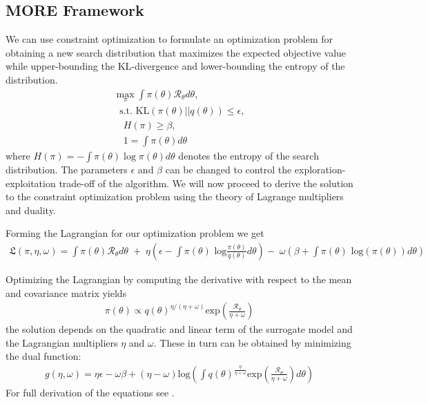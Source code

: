 \subsection{MORE Framework}
We can use constraint optimization
to formulate an optimization problem  for
obtaining a new search distribution that
maximizes the expected objective value while
upper-bounding the KL-divergence and
lower-bounding the entropy of the distribution. \\
\begin{equation}
  \label{more_opt}
  \begin{aligned}
    \max_{\pi} \int \pi(\theta) \mathcal{R}_{\theta} d\theta, \\
    \; \text{ s.t. KL}(\pi(\theta)||q(\theta)) \leq \epsilon, \\
    \quad H(\pi) \geq \beta, \\
    \quad 1 = \int \pi(\theta) d\theta
  \end{aligned}
\end{equation}
where $H(\pi) = - \int \pi(\theta) \log \pi(\theta) d\theta$ denotes
the entropy of the search distribution.
The parameters $\epsilon$ and $\beta$ can be changed to control the
exploration-exploitation trade-off of the algorithm.
We will now proceed to derive the solution to the constraint optimization
problem using the theory of Lagrange multipliers and duality.

Forming the Lagrangian for our optimization problem we get
\begin{align*} \mathfrak{L}(\pi, \eta, \omega) = 
\int \pi(\theta) \mathcal{R}_{\theta} d\theta \; + \; 
\eta  \left(\epsilon - \int \pi(\theta) \text{ log}
 \frac{\pi(\theta)}{q(\theta)} d\theta\right)
 - \; \omega \left(\beta + \int \pi(\theta) \text{ log}(\pi(\theta)) d\theta\right)
\end{align*}

Optimizing the Lagrangian by computing the derivative with respect
to the mean and covariance matrix yields
\begin{align*}
\pi(\theta) \propto q(\theta)^{\eta/(\eta+\omega)} 
\text{exp}\left(\frac{\mathcal{R}_\theta}{\eta + \omega}\right)
\end{align*}
the solution depends on the quadratic and linear term
of the surrogate model and the
Lagrangian multipliers
$\eta$ and $\omega$. These in turn can be obtained by
minimizing the dual function:
\begin{align*}
  g(\eta,\omega) = \eta\epsilon - \omega\beta + (\eta - \omega) \text{log}
\left(\int q(\theta)^{\frac{\eta}{\eta + \omega}}
  \text{exp}\left(\frac{\mathcal{R}_\theta}{\eta + \omega}\right) d\theta \right)
\end{align*}
For full derivation of the equations see .


